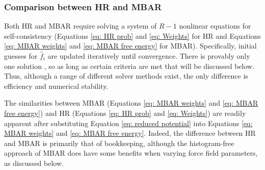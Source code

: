 \documentclass[journal=jced,manuscript=article]{achemso}
\newcommand{\bfv}[1]{{\mbox{\boldmath{$#1$}}}}
\newcommand{\x}{\bfv{x}}
\begin{document}
\subsubsection{Comparison between HR and MBAR} \label{sec: HR and MBAR}

Both HR and MBAR require solving a system of $R-1$ nonlinear equations for self-consistency (Equations \ref{eq: HR prob} and \ref{eq: Weights} for HR and Equations \ref{eq: MBAR weights} and \ref{eq: MBAR free energy} for MBAR). Specifically, initial guesses for $\hat f_i$ are updated iteratively until convergence. There is provably only one solution \cite{shirts-chodera:jcp:2008:mbar}, so as long as certain criteria are met that will be discussed below. Thus, although a range of different solver methods exist, the only difference is efficiency and numerical stability.

The similarities between MBAR (Equations \ref{eq: MBAR weights} and \ref{eq: MBAR free energy}) and HR (Equations \ref{eq: HR prob} and \ref{eq: Weights}) are readily apparent after substituting Equation \ref{eq: reduced potential} into Equations \ref{eq: MBAR weights} and \ref{eq: MBAR free energy}. Indeed, the difference between HR and MBAR is primarily that of bookkeeping, although the histogram-free approach of MBAR does have some benefits when varying force field parameters, as discussed below. 


\end{document}
